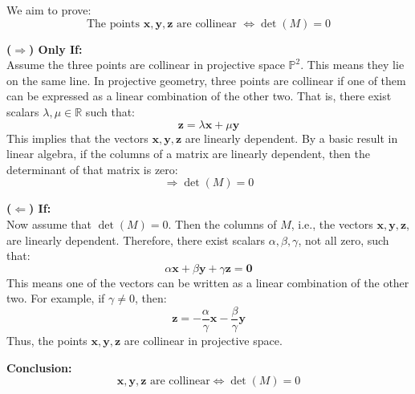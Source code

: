 We aim to prove:
\[
\text{The points } \mathbf{x}, \mathbf{y}, \mathbf{z} \text{ are collinear } \iff \det(M) = 0
\]

\vspace{0.5em}
\textbf{($\Rightarrow$) Only If:} \\
Assume the three points are collinear in projective space $\mathbb{P}^2$. This means they lie on the same line. In projective geometry, three points are collinear if one of them can be expressed as a linear combination of the other two. That is, there exist scalars $\lambda, \mu \in \mathbb{R}$ such that:
\[
\mathbf{z} = \lambda \mathbf{x} + \mu \mathbf{y}
\]
This implies that the vectors $\mathbf{x}, \mathbf{y}, \mathbf{z}$ are linearly dependent. By a basic result in linear algebra, if the columns of a matrix are linearly dependent, then the determinant of that matrix is zero:
\[
\Rightarrow \det(M) = 0
\]

\vspace{0.5em}
\textbf{($\Leftarrow$) If:} \\
Now assume that $\det(M) = 0$. Then the columns of $M$, i.e., the vectors $\mathbf{x}, \mathbf{y}, \mathbf{z}$, are linearly dependent. Therefore, there exist scalars $\alpha, \beta, \gamma$, not all zero, such that:
\[
\alpha \mathbf{x} + \beta \mathbf{y} + \gamma \mathbf{z} = \mathbf{0}
\]
This means one of the vectors can be written as a linear combination of the other two. For example, if $\gamma \ne 0$, then:
\[
\mathbf{z} = -\frac{\alpha}{\gamma} \mathbf{x} - \frac{\beta}{\gamma} \mathbf{y}
\]
Thus, the points $\mathbf{x}, \mathbf{y}, \mathbf{z}$ are collinear in projective space.

\vspace{0.5em}
\textbf{Conclusion:}
\[
\boxed{
\mathbf{x}, \mathbf{y}, \mathbf{z} \text{ are collinear} \iff \det(M) = 0
}
\]
